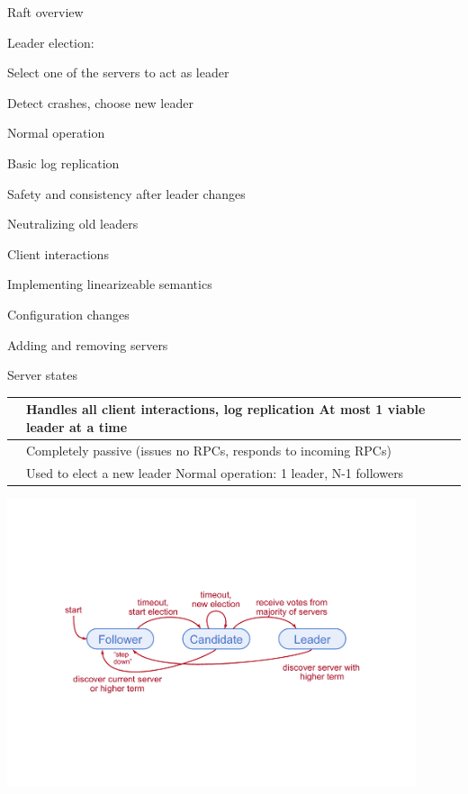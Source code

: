 \begin{frame}{Raft overview}
	
\BEL
\item Leader election:
	\BI
	\item Select one of the servers to act as leader
	\item Detect crashes, choose new leader
	\EI
\item Normal operation 
	\BI
	\item Basic log replication
	\EI
\item Safety and consistency after leader changes
\item Neutralizing old leaders
\item Client interactions
	\BI
	\item Implementing linearizeable semantics
	\EI
\item Configuration changes
	\BI
	\item Adding and removing servers
	\EI
\EEL

\end{frame}

\begin{frame}{Server states}

\begin{tabular}{| P{2cm} | P{9cm} | }
\hline
\RED{\Leader} & Handles all client interactions, log replication \newline
At most 1 viable leader at a time\\\hline
\RED{\Follower} & Completely passive (issues no RPCs, responds to incoming RPCs)\\\hline
\RED{\Candidate} & Used to elect a new leader\newline
Normal operation: 1 leader, N-1 followers\\\hline
\end{tabular}

\bigskip
\begin{center}
\includegraphics[width=0.90\textwidth]{states.pdf}
\end{center}
\end{frame}

